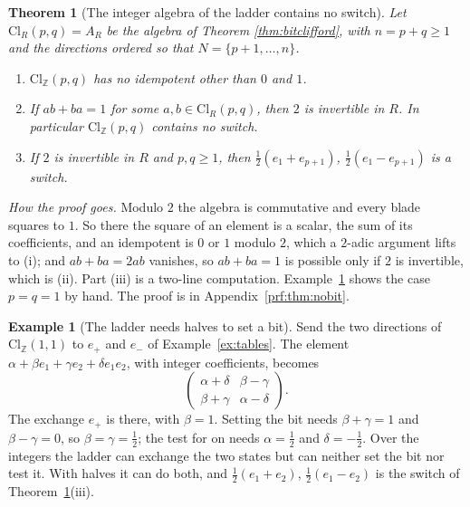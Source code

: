 \documentclass[11pt]{article}
\theoremstyle{plain}
\newtheorem{theorem}{Theorem}[section]
\theoremstyle{definition}
\newtheorem{example}{Example}
\theoremstyle{plain}
\theoremstyle{definition}
\newcommand{\Cl}{\mathrm{Cl}}
\newcommand{\Z}{\mathbb{Z}}
\begin{document}
\begin{theorem}[The integer algebra of the ladder contains no switch]\label{thm:nobit}
Let $\Cl_{R}(p,q) = A_{R}$ be the algebra of Theorem \ref{thm:bitclifford}, with $n = p + q \geq 1$ and the directions ordered so that $N = \{p+1, \dots, n\}$.
\begin{enumerate}
\item[(i)] $\Cl_{\Z}(p,q)$ has no idempotent other than $0$ and $1$.
\item[(ii)] If $ab + ba = 1$ for some $a, b \in \Cl_{R}(p,q)$, then $2$ is invertible in $R$. In particular $\Cl_{\Z}(p,q)$ contains no switch.
\item[(iii)] If $2$ is invertible in $R$ and $p, q \geq 1$, then $\tfrac12(e_{1} + e_{p+1})$, $\tfrac12(e_{1} - e_{p+1})$ is a switch.
\end{enumerate}
\end{theorem}




\noindent\emph{How the proof goes.} Modulo $2$ the algebra is commutative and every blade squares to $1$. So there the square of an element is a scalar, the sum of its coefficients, and an idempotent is $0$ or $1$ modulo $2$, which a $2$-adic argument lifts to (i); and $ab + ba = 2ab$ vanishes, so $ab + ba = 1$ is possible only if $2$ is invertible, which is (ii). Part (iii) is a two-line computation. Example~\ref{ex:halves} shows the case $p = q = 1$ by hand. The proof is in Appendix~\ref{prf:thm:nobit}.

\begin{example}[The ladder needs halves to set a bit]\label{ex:halves}
Send the two directions of $\Cl_{\Z}(1,1)$ to $e_{+}$ and $e_{-}$ of Example~\ref{ex:tables}. The element $\alpha + \beta e_{1} + \gamma e_{2} + \delta e_{1}e_{2}$, with integer coefficients, becomes
\[
\begin{pmatrix} \alpha + \delta & \beta - \gamma \\ \beta + \gamma & \alpha - \delta \end{pmatrix} .
\]
The exchange $e_{+}$ is there, with $\beta = 1$. Setting the bit needs $\beta + \gamma = 1$ and $\beta - \gamma = 0$, so $\beta = \gamma = \tfrac12$; the test for on needs $\alpha = \tfrac12$ and $\delta = -\tfrac12$. Over the integers the ladder can exchange the two states but can neither set the bit nor test it. With halves it can do both, and $\tfrac12(e_{1} + e_{2})$, $\tfrac12(e_{1} - e_{2})$ is the switch of Theorem~\ref{thm:nobit}(iii).
\end{example}
\end{document}

